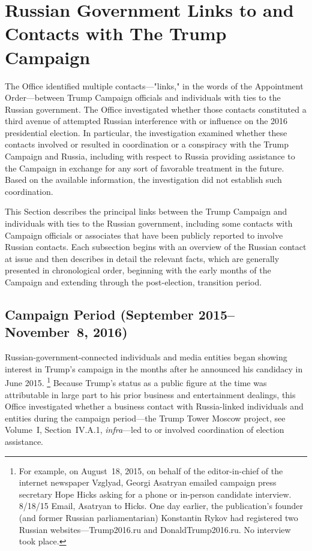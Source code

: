 \section{Russian Government Links to and Contacts with The Trump Campaign}

The Office identified multiple contacts---"links," in the words of the Appointment Order---between Trump Campaign officials and individuals with ties to the Russian government.
The Office investigated whether those contacts constituted a third avenue of attempted Russian interference with or influence on the 2016 presidential election.
In particular, the investigation examined whether these contacts involved or resulted in coordination or a conspiracy with the Trump Campaign and Russia, including with respect to Russia providing assistance to the Campaign in exchange for any sort of favorable treatment in the future.
Based on the available information, the investigation did not establish such coordination.

This Section describes the principal links between the Trump Campaign and individuals with ties to the Russian government, including some contacts with Campaign officials or associates that have been publicly reported to involve Russian contacts.
Each subsection begins with an overview of the Russian contact at issue and then describes in detail the relevant facts, which are generally presented in chronological order, beginning with the early months of the Campaign and extending through the post-election, transition period.

\subsection{Campaign Period (September 2015--November~8, 2016)}

Russian-government-connected individuals and media entities began showing interest in Trump's campaign in the months after he announced his candidacy in June 2015.%
\footnote{For example, on August~18, 2015, on behalf of the editor-in-chief of the internet newspaper Vzglyad, Georgi Asatryan emailed campaign press secretary Hope Hicks asking for a phone or in-person candidate interview.
8/18/15 Email, Asatryan to Hicks.
One day earlier, the publication's founder (and former Russian parliamentarian) Konstantin Rykov had registered two Russian websites---Trump2016.ru and DonaldTrump2016.ru.
No interview took place.}
Because Trump's status as a public figure at the time was attributable in large part to his prior business and entertainment dealings, this Office investigated whether a business contact with Russia-linked individuals and entities during the campaign period---the Trump Tower Moscow project, see Volume~I, Section~IV.A.1, \textit{infra}---led to or involved coordination of election assistance.

